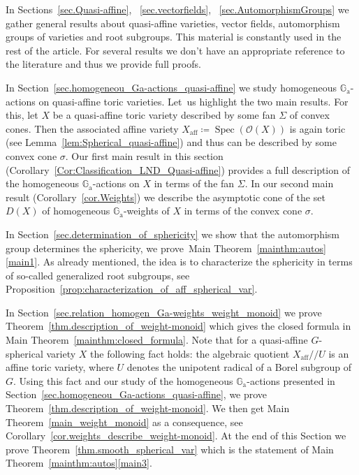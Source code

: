 \documentclass[JEP,XML,SOM,Unicode]{cedram}
\let\mathcal\mathscr
\newcommand{\ra}{\mathrm{a}}
\theoremstyle{plain}
\theoremstyle{definition}
\DeclareMathOperator{\Spec}{Spec}
\DeclareMathOperator{\aff}{aff}
\newcommand{\OO}{\mathcal{O}}
\newcommand{\GG}{\mathbb{G}}
\newcommand{\aquot}{/ \! \! /}
\begin{document}
In Sections~\ref{sec.Quasi-affine}, ~\ref{sec.vectorfields}, ~\ref{sec.AutomorphismGroups}
we gather general results about quasi-affine varieties,
vector fields, automorphism groups of varieties and root subgroups.
This material is constantly used in the rest of the article.
For several results we don't have an appropriate reference to the literature and
thus we provide full proofs.

In Section~\ref{sec.homogeneou_Ga-actions_quasi-affine} we study homogeneous $\GG_\ra$-actions
on quasi-affine toric varieties. Let~us highlight the two main results. For this, let
$X$ be a quasi-affine toric variety described by some fan $\Sigma$ of convex cones.
Then the associated affine variety $X_{\aff} \coloneqq \Spec(\OO(X))$
is again toric (see Lemma~\ref{lem:Spherical_quasi-affine}) and thus can
be described by some convex cone $\sigma$.
Our first main result in this section (Corollary~\ref{Cor:Classification_LND_Quasi-affine})
provides
a full description of the homogeneous $\GG_\ra$-actions on $X$ in terms of the fan $\Sigma$.
In our second main result (Corollary~\ref{cor.Weights})
we describe the asymptotic cone of the set $D(X)$
of homogeneous $\GG_\ra$-weights of $X$ in terms of the convex cone $\sigma$.

In Section~\ref{sec.determination_of_sphericity} we show that the automorphism
group determines the sphericity, \ie we prove~Main Theorem~\ref{mainthm:autos}\eqref{main1}.
As already mentioned, the idea is to characterize the sphericity in terms of so-called
generalized root subgroups, see Proposition~\ref{prop:characterization_of_aff_spherical_var}.

In Section~\ref{sec.relation_homogen_Ga-weights_weight_monoid} we prove
Theorem~\ref{thm.description_of_weight-monoid} which gives the closed formula
in Main Theorem~\ref{mainthm:closed_formula}. Note that
for a quasi-affine $G$-spherical variety $X$ the following fact holds:
the algebraic quotient $X_{\aff} \aquot U$ is an affine toric variety, where $U$ denotes
the unipotent radical of a Borel subgroup of $G$. Using this fact
and our study of the
homogeneous $\GG_\ra$-actions presented in Section~\ref{sec.homogeneou_Ga-actions_quasi-affine},
we prove Theorem~\ref{thm.description_of_weight-monoid}. We then get
Main Theorem~\ref{main_weight_monoid} as a consequence, see Corollary~\ref{cor.weights_describe_weight-monoid}. At the end of this Section we prove
Theorem~\ref{thm.smooth_spherical_var} which is the statement of Main Theorem~\ref{mainthm:autos}\eqref{main3}.
\end{document}

